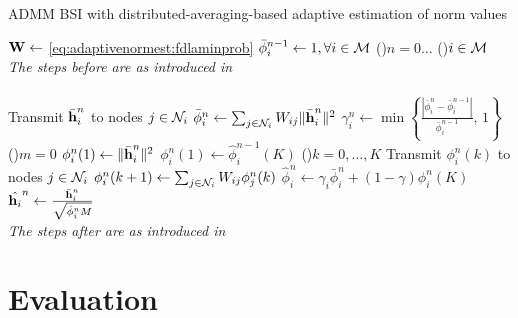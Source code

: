 \documentclass{article}
\begin{document}
\begin{algorithm}[t]
    \caption{ADMM BSI with distributed-averaging-based adaptive estimation of norm values}\label{alg:davg_norm_est}
    \(\bm{\mathrm{W}} \gets\) \eqref{eq:adaptivenormest:fdlaminprob}\;
    \(\bar{\phi}_i^{n-1} \gets 1, \forall i \in \mathcal{M}\)\;
    \For(){\(n=0\dots\)}
    {
        \For(){\(i \in \mathcal{M}\)}
        {
            \emph{The steps before are as introduced in }\cite{blochbergerDBSI}\\
            \dotfill\\
            Transmit \(\bar{\bm{\mathrm{h}}}_i^{n}\) to nodes  \(j \in \mathcal{N}_i\)\;
            \(\bar{\phi}_i^{n} \gets \sum_{j \in \mathcal{N}_i} W_{ij} \|\bar{\bm{\mathrm{h}}}_i^n\|^2\)\;
            \(\gamma_i^{n} \gets \min \left\lbrace \frac{| \bar{\phi}_i^{n} - \bar{\phi}_i^{n-1} |}{\bar{\phi}_i^{n-1}},\,1\right\rbrace\)\;
            \eIf(){\(m = 0\)}
            {
                \(\phi_i^{n}(1) \gets \|\bar{\bm{\mathrm{h}}}_i^n\|^2\)\;
            }
            {
                \(\phi_i^{n}(1) \gets \hat{\phi}_i^{n-1}(K)\)\;
            }
            \For(){\(k=0,\dots,K\)}
            {
                Transmit \(\phi_i^n(k)\) to nodes  \(j \in \mathcal{N}_i\)\;
                \(\phi_i^n({k+1}) \gets \sum_{j \in \mathcal{N}_i} W_{ij} \phi_j^n({k})\)\;
            }
            \(\hat{\phi}_i^{n} \gets \gamma_i \bar{\phi}_i^{n} + (1-\gamma) \phi_i^{n}(K)\)\;
            \(\hat{\bm{\mathrm{h}}_i}^{n} \gets \frac{\bar{\bm{\mathrm{h}}}_i^{n}}{\sqrt{\hat{\phi}_i^{n}M}}\)\;
            \dotfill\\
            \emph{The steps after are as introduced in }\cite{blochbergerDBSI}\\
        }
    }
\end{algorithm}



\section{Evaluation}
\label{sec:simulations}
\end{document}
